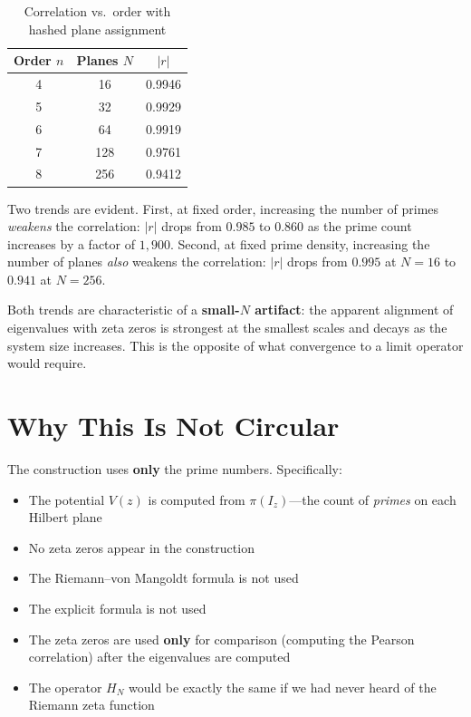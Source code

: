 \documentclass[11pt,a4paper]{article}
\theoremstyle{definition}
\begin{document}
\begin{table}[htbp]
\centering
\caption{Correlation vs.\ order with hashed plane assignment}
\begin{tabular}{@{}ccc@{}}
\toprule
\textbf{Order $n$} & \textbf{Planes $N$} & \textbf{$|r|$} \\
\midrule
4 & 16  & 0.9946 \\
5 & 32  & 0.9929 \\
6 & 64  & 0.9919 \\
7 & 128 & 0.9761 \\
8 & 256 & 0.9412 \\
\bottomrule
\end{tabular}
\end{table}

Two trends are evident. First, at fixed order, increasing the number of
primes \emph{weakens} the correlation: $|r|$ drops from $0.985$ to
$0.860$ as the prime count increases by a factor of $1{,}900$. Second,
at fixed prime density, increasing the number of planes \emph{also}
weakens the correlation: $|r|$ drops from $0.995$ at $N=16$ to $0.941$
at $N=256$.

Both trends are characteristic of a \textbf{small-$N$ artifact}: the
apparent alignment of eigenvalues with zeta zeros is strongest at the
smallest scales and decays as the system size increases. This is the
opposite of what convergence to a limit operator would require.

\section{Why This Is Not Circular}

The construction uses \textbf{only} the prime numbers. Specifically:

\begin{itemize}
\item The potential $V(z)$ is computed from $\pi(I_z)$---the count of
  \emph{primes} on each Hilbert plane
\item No zeta zeros appear in the construction
\item The Riemann--von Mangoldt formula is not used
\item The explicit formula is not used
\item The zeta zeros are used \textbf{only} for comparison (computing
  the Pearson correlation) after the eigenvalues are computed
\item The operator $H_N$ would be exactly the same if we had never
  heard of the Riemann zeta function
\end{itemize}
\end{document}
